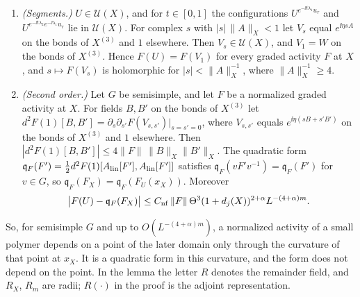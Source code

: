 \begin{lemma}
\begin{enumerate}[label=(\alph*)]
\[
\|A_{\rm lin}[F_X]\|_X\le C_{\rm nf}(1+d_j(X))\,\Theta\,L^{-2m},\qquad\|R\|_X\le C_{\rm nf}(1+d_j(X))^{1+\alpha}\,\Theta\,L^{-(2+\alpha)m}.
\]
\item \emph{(Segments.)} $U\in\mathcal U(X)$, and for $t\in[0,1]$ the configurations $U^{e^{-\ii t\lambda_1}u_r}$ and $U^{e^{-\ii t\lambda_2}e^{-\ii\lambda_1}u_r}$ lie in $\mathcal U(X)$. For complex $s$ with $|s|\,\|A\|_X<1$ let $V_s$ equal $e^{\ii\eta sA}$ on the bonds of $X^{(3)}$ and $1$ elsewhere. Then $V_s\in\mathcal U(X)$, and $V_1=W$ on the bonds of $X^{(3)}$. Hence $F(U)=F(V_1)$ for every graded activity $F$ at $X$, and $s\mapsto F(V_s)$ is holomorphic for $|s|<\|A\|_X^{-1}$, where $\|A\|_X^{-1}\ge4$.
\item \emph{(Second order.)} Let $G$ be semisimple, and let $F$ be a normalized graded activity at $X$. For fields $B,B'$ on the bonds of $X^{(3)}$ let $d^2F(1)[B,B']=\partial_s\partial_{s'}F(V_{s,s'})|_{s=s'=0}$, where $V_{s,s'}$ equals $e^{\ii\eta(sB+s'B')}$ on the bonds of $X^{(3)}$ and $1$ elsewhere. Then $|d^2F(1)[B,B']|\le4\|F\|\,\|B\|_X\|B'\|_X$. The quadratic form $\mathfrak q_F(F')=\frac12d^2F(1)[A_{\rm lin}[F'],A_{\rm lin}[F']]$ satisfies $\mathfrak q_F(vF'v^{-1})=\mathfrak q_F(F')$ for $v\in G$, so $\mathfrak q_F(F_X)=\mathfrak q_F(F_U(x_X))$. Moreover
\[
\big|F(U)-\mathfrak q_F(F_X)\big|\le C_{\rm nf}\,\|F\|\,\Theta^3(1+d_j(X))^{2+\alpha}L^{-(4+\alpha)m} .
\]
\end{enumerate}
\end{lemma}

So, for semisimple $G$ and up to $O(L^{-(4+\alpha)m})$, a normalized activity of a small polymer depends on a point of the later domain only through the curvature of that point at $x_X$. It is a quadratic form in this curvature, and the form does not depend on the point. In the lemma the letter $R$ denotes the remainder field, and $R_X$, $R_m$ are radii; $R(\cdot)$ in the proof is the adjoint representation.

